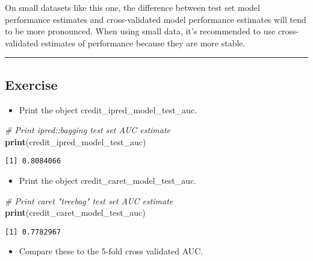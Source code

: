 \documentclass[
]{book}
\newenvironment{Shaded}{\begin{snugshade}}{\end{snugshade}}
\newcommand{\CommentTok}[1]{\textcolor[rgb]{0.56,0.35,0.01}{\textit{#1}}}
\newcommand{\KeywordTok}[1]{\textcolor[rgb]{0.13,0.29,0.53}{\textbf{#1}}}
\newcommand{\NormalTok}[1]{#1}
\providecommand{\tightlist}{%
  \setlength{\itemsep}{0pt}\setlength{\parskip}{0pt}}
\begin{document}
On small datasets like this one, the difference between test set model performance estimates and cross-validated model performance estimates will tend to be more pronounced. When using small data, it's recommended to use cross-validated estimates of performance because they are more stable.

\begin{center}\rule{0.5\linewidth}{0.5pt}\end{center}

\hypertarget{exercise-15}{%
\subsection*{Exercise}\label{exercise-15}}

\begin{itemize}
\tightlist
\item
  Print the object credit\_ipred\_model\_test\_auc.
\end{itemize}

\begin{Shaded}
\begin{Highlighting}[]
\CommentTok{# Print ipred::bagging test set AUC estimate}
\KeywordTok{print}\NormalTok{(credit_ipred_model_test_auc)}
\end{Highlighting}
\end{Shaded}

\begin{verbatim}
[1] 0.8084066
\end{verbatim}

\begin{itemize}
\tightlist
\item
  Print the object credit\_caret\_model\_test\_auc.
\end{itemize}

\begin{Shaded}
\begin{Highlighting}[]
\CommentTok{# Print caret "treebag" test set AUC estimate}
\KeywordTok{print}\NormalTok{(credit_caret_model_test_auc)}
\end{Highlighting}
\end{Shaded}

\begin{verbatim}
[1] 0.7782967
\end{verbatim}

\begin{itemize}
\tightlist
\item
  Compare these to the 5-fold cross validated AUC.
\end{itemize}
\end{document}
